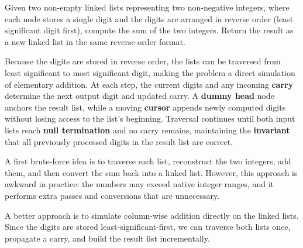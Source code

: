 %


\label{prob:lc-002-add-two-numbers}

\ProblemSummary
Given two non-empty linked lists representing two non-negative integers, where
each node stores a single digit and the digits are arranged in reverse order
(least significant digit first), compute the sum of the two integers.
Return the result as a new linked list in the same reverse-order format.

\KeyIdea
Because the digits are stored in reverse order, the lists can be traversed
from least significant to most significant digit, making the problem a direct
simulation of elementary addition. At each step, the current digits and any
incoming \textbf{carry} determine the next output digit and updated carry.
A \textbf{dummy head} node anchors the result list, while a moving
\textbf{cursor} appends newly computed digits without losing access to the
list's beginning. Traversal continues until both input lists reach
\textbf{null termination} and no carry remains, maintaining the \textbf{invariant}
that all previously processed digits in the result list are correct.

\begin{Thinking}
A first brute-force idea is to traverse each list, reconstruct the two integers,
add them, and then convert the sum back into a linked list. However, this
approach is awkward in practice: the numbers may exceed native integer ranges,
and it performs extra passes and conversions that are unnecessary.

A better approach is to simulate column-wise addition directly on the linked
lists. Since the digits are stored least-significant-first, we can traverse
both lists once, propagate a carry, and build the result list incrementally.
\end{Thinking}

